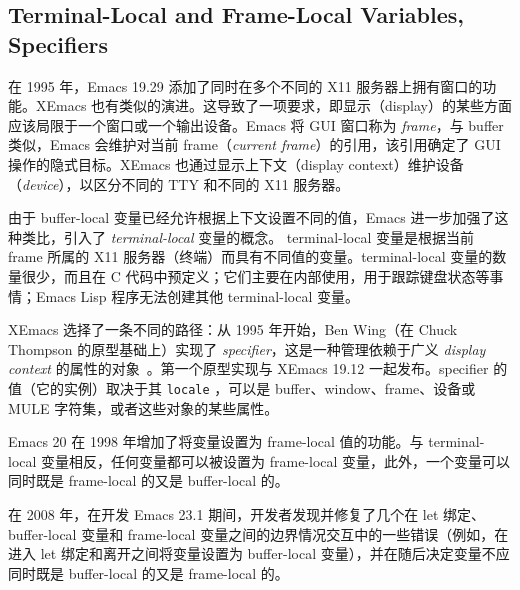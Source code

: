 \documentclass[format=acmsmall,screen]{acmart}
\begin{document}




\subsection{Terminal-Local and Frame-Local Variables, Specifiers}

在 1995 年，Emacs 19.29 添加了同时在多个不同的 X11 服务器上拥有窗口的功能。XEmacs 也有类似的演进。这导致了一项要求，即显示（display）的某些方面应该局限于一个窗口或一个输出设备。Emacs 将 GUI 窗口称为 \emph{frame}，与 buffer 类似，Emacs 会维护对当前 frame（\emph{current frame}）的引用，该引用确定了 GUI 操作的隐式目标。XEmacs 也通过显示上下文（display context）维护设备（\emph{device}），以区分不同的 TTY 和不同的 X11 服务器。

由于 buffer-local 变量已经允许根据上下文设置不同的值，Emacs 进一步加强了这种类比，引入了 \emph{terminal-local} 变量的概念。 terminal-local 变量是根据当前 frame 所属的 X11 服务器（终端）而具有不同值的变量。terminal-local 变量的数量很少，而且在 C 代码中预定义；它们主要在内部使用，用于跟踪键盘状态等事情；Emacs Lisp 程序无法创建其他 terminal-local 变量。

XEmacs 选择了一条不同的路径：从 1995 年开始，Ben Wing（在 Chuck Thompson 的原型基础上）实现了 \emph{specifier}，这是一种管理依赖于广义 \emph{display context} 的属性的对象~\cite{XEmacsLispRef1998}。第一个原型实现与 XEmacs 19.12 一起发布。specifier 的值（它的实例）取决于其 \texttt{locale} ，可以是 buffer、window、frame、设备或 MULE 字符集，或者这些对象的某些属性。

Emacs 20 在 1998 年增加了将变量设置为 frame-local 值的功能。与 terminal-local 变量相反，任何变量都可以被设置为 frame-local 变量，此外，一个变量可以同时既是 frame-local 的又是 buffer-local 的。

在 2008 年，在开发 Emacs 23.1 期间，开发者发现并修复了几个在 let 绑定、buffer-local 变量和 frame-local 变量之间的边界情况交互中的一些错误（例如，在进入 let 绑定和离开之间将变量设置为 buffer-local 变量），并在随后决定变量不应同时既是 buffer-local 的又是 frame-local 的。
\end{document}
